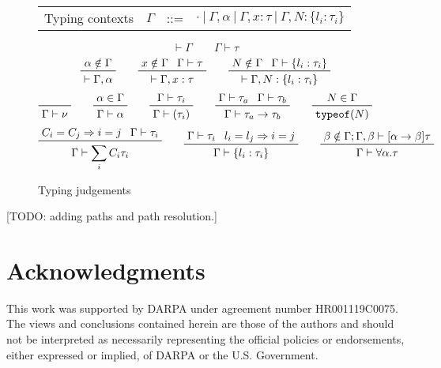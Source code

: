 \documentclass[letterpaper]{article}
\newcommand{\todo}[1]{{\color{red}[TODO: #1]}}
\begin{document}
\begin{figure}
    \begin{tabular}{l c l l}
    Typing contexts        & $\Gamma$      & ::= & $\cdot\ |\ \Gamma, \alpha\ |\ \Gamma, x: \tau\ |\ \Gamma, N: \{l_i:\tau_i\}$ \\
  \end{tabular}

  $$ \boxed{\vdash\Gamma} \qquad \boxed{\Gamma\vdash\tau} $$
  $$ \prftree{\prfassumption{\alpha\notin\Gamma}}
             {\vdash\Gamma, \alpha}\qquad
     \prftree{\prfassumption{x\notin\Gamma}}{\prfassumption{\Gamma\vdash\tau}}
             {\vdash\Gamma, x:\tau}\qquad
     \prftree{\prfassumption{N\notin\Gamma}}{\prfassumption{\Gamma\vdash\{l_i:\tau_i\}}}
             {\vdash\Gamma, N:\{l_i:\tau_i\}} $$
  $$ \prfaxiom{\Gamma\vdash\nu}\qquad
     \prftree{\prfassumption{\alpha\in\Gamma}}
             {\Gamma\vdash\alpha}\qquad
     \prftree{\prfassumption{\Gamma\vdash\tau_i}}
             {\Gamma\vdash(\tau_i)}\qquad
     \prftree{\prfassumption{\Gamma\vdash\tau_a}}{\prfassumption{\Gamma\vdash\tau_b}}
             {\Gamma\vdash\tau_a\rightarrow\tau_b}\qquad
     \prftree{\prfassumption{N\in\Gamma}}
             {\texttt{typeof}(N)} $$
  $$ \prftree{\prfassumption{C_i=C_j\Rightarrow i=j}}{\prfassumption{\Gamma\vdash\tau_i}}
             {\Gamma\vdash\sum_i C_i\tau_i}\qquad
     \prftree{\prfassumption{\Gamma\vdash\tau_i}}{\prfassumption{l_i=l_j\Rightarrow i=j}}
             {\Gamma\vdash\{l_i:\tau_i\}}\qquad
     \prftree{\prfassumption{\beta\notin\Gamma; \Gamma,\beta\vdash[\alpha\rightarrow\beta]\tau}}
             {\Gamma\vdash\forall\alpha.\tau} $$
  \caption{Typing judgements}
  \label{f:ctxt}
\end{figure}

\todo{adding paths and path resolution.}

\section*{Acknowledgments}
This work was supported by DARPA under agreement number HR001119C0075.
The views and conclusions contained herein are those of the authors
and should not be interpreted as necessarily representing the official
policies or endorsements, either expressed or implied, of DARPA or the
U.S. Government.



\end{document}
